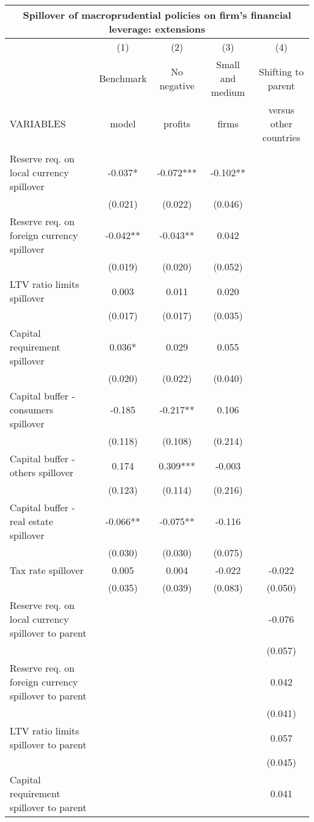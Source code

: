\begin{tabular}{lcccc}
\multicolumn{5}{c}{Spillover of macroprudential policies on firm's financial leverage: extensions} \\ \hline
 & (1) & (2) & (3) & (4) \\
 & Benchmark & No negative & Small and medium & Shifting to parent \\
VARIABLES & model & profits & firms & versus other countries \\ \hline
 &  &  &  &  \\
Reserve req. on local currency spillover & -0.037* & -0.072*** & -0.102** &  \\
 & (0.021) & (0.022) & (0.046) &  \\
Reserve req. on foreign currency spillover & -0.042** & -0.043** & 0.042 &  \\
 & (0.019) & (0.020) & (0.052) &  \\
LTV ratio limits spillover & 0.003 & 0.011 & 0.020 &  \\
 & (0.017) & (0.017) & (0.035) &  \\
Capital requirement spillover & 0.036* & 0.029 & 0.055 &  \\
 & (0.020) & (0.022) & (0.040) &  \\
Capital buffer - consumers spillover & -0.185 & -0.217** & 0.106 &  \\
 & (0.118) & (0.108) & (0.214) &  \\
Capital buffer - others spillover & 0.174 & 0.309*** & -0.003 &  \\
 & (0.123) & (0.114) & (0.216) &  \\
Capital buffer - real estate spillover & -0.066** & -0.075** & -0.116 &  \\
 & (0.030) & (0.030) & (0.075) &  \\
Tax rate spillover & 0.005 & 0.004 & -0.022 & -0.022 \\
 & (0.035) & (0.039) & (0.083) & (0.050) \\
Reserve req. on local currency spillover to parent &  &  &  & -0.076 \\
 &  &  &  & (0.057) \\
Reserve req. on foreign currency spillover to parent &  &  &  & 0.042 \\
 &  &  &  & (0.041) \\
LTV ratio limits spillover to parent &  &  &  & 0.057 \\
 &  &  &  & (0.045) \\
Capital requirement spillover to parent &  &  &  & 0.041 \\

\end{tabular}
